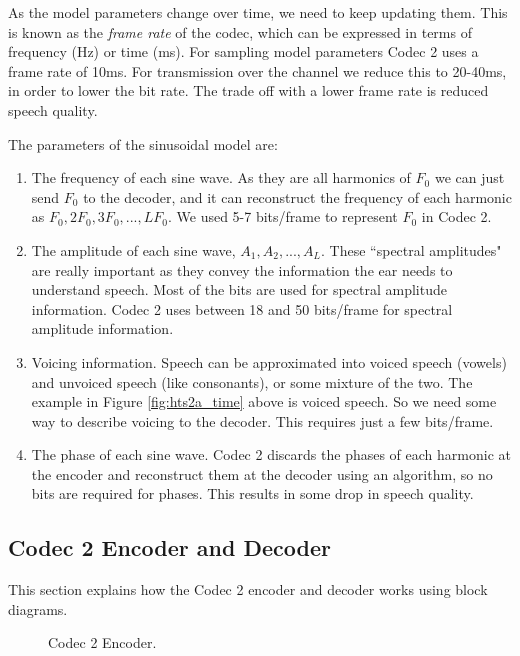\documentclass{article}
\begin{document}
{As the model parameters change over time, we need to keep updating them.  This is known as the \emph{frame rate} of the codec, which can be expressed in terms of frequency (Hz) or time (ms).  For sampling model parameters Codec 2 uses a frame rate of 10ms.  For transmission over the channel we reduce this to 20-40ms, in order to lower the bit rate.  The trade off with a lower frame rate is reduced speech quality.

The parameters of the sinusoidal model are:
\begin{enumerate}
\item The frequency of each sine wave.  As they are all harmonics of $F_0$ we can just send $F_0$ to the decoder, and it can reconstruct the frequency of each harmonic as $F_0,2F_0,3F_0,...,LF_0$.  We used 5-7 bits/frame to represent $F_0$ in Codec 2.
\item The amplitude of each sine wave, $A_1,A_2,...,A_L$.  These ``spectral amplitudes" are really important as they convey the information the ear needs to understand speech.  Most of the bits are used for spectral amplitude information.  Codec 2 uses between 18 and 50 bits/frame for spectral amplitude information.
\item Voicing information.  Speech can be approximated into voiced speech (vowels) and unvoiced speech (like consonants), or some mixture of the two.  The example in Figure \ref{fig:hts2a_time} above is voiced speech.  So we need some way to describe voicing to the decoder. This requires just a few bits/frame.
\item The phase of each sine wave.  Codec 2 discards the phases of each harmonic at the encoder and reconstruct them at the decoder using an algorithm, so no bits are required for phases.  This results in some drop in speech quality.
\end{enumerate}

\subsection{Codec 2 Encoder and Decoder}

This section explains how the Codec 2 encoder and decoder works using block diagrams.

\begin{figure}[h]
\caption{Codec 2 Encoder.}
\label{fig:codec2_encoder}
\begin{center}
\begin{tikzpicture}[auto, node distance=2cm,>=triangle 45,x=1.0cm,y=1.0cm,align=center,text width=2cm]


\end{tikzpicture}
\end{center}
\end{figure}}
\end{document}
